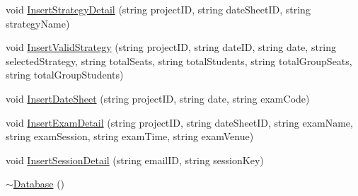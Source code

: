 \begin{DoxyCompactItemize}
\item 
void \hyperlink{classDatabase_a8a13b478ab9c5c9fabc07b9513530bc0}{\-Insert\-Strategy\-Detail} (string project\-I\-D, string date\-Sheet\-I\-D, string strategy\-Name)
\item 
void \hyperlink{classDatabase_ae20d8dbfb3d8755cd4cf508a503fd9b6}{\-Insert\-Valid\-Strategy} (string project\-I\-D, string date\-I\-D, string date, string selected\-Strategy, string total\-Seats, string total\-Students, string total\-Group\-Seats, string total\-Group\-Students)
\item 
void \hyperlink{classDatabase_ab410079853d849a9104be0689abee878}{\-Insert\-Date\-Sheet} (string project\-I\-D, string date, string exam\-Code)
\item 
void \hyperlink{classDatabase_a1c68383f46e3c3026ff53aeb4e5f76ab}{\-Insert\-Exam\-Detail} (string project\-I\-D, string date\-Sheet\-I\-D, string exam\-Name, string exam\-Session, string exam\-Time, string exam\-Venue)
\item 
void \hyperlink{classDatabase_a61963a0b66aca78ffa950b22ee959c47}{\-Insert\-Session\-Detail} (string email\-I\-D, string session\-Key)
\item 
\hyperlink{classDatabase_a84d399a2ad58d69daab9b05330e1316d}{$\sim$\-Database} ()
\end{DoxyCompactItemize}
